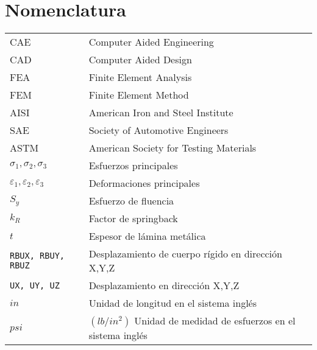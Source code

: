 \chapter*{Nomenclatura}




\begin{table}[h]
\def\arraystretch{1.15}
\begin{tabular}{p{4cm} p{12cm}}

CAE      &                       		      Computer Aided Engineering \\
CAD &                                  		  Computer Aided Design \\
FEA &                                  		  Finite Element Analysis \\
FEM & 							              Finite Element Method \\
AISI &                                        American Iron and Steel Institute \\
SAE &                                         Society of Automotive Engineers \\
ASTM &                                        American Society for Testing Materials \\
$\sigma_1, \sigma_2, \sigma_3$ &              Esfuerzos principales \\
$\varepsilon_1, \varepsilon_2, \varepsilon_3$ & Deformaciones principales \\
$ S_y $ &                                     Esfuerzo de fluencia \\
$ k_R $ &                                     Factor de springback \\
$ t $ &                                       Espesor de lámina metálica \\
{\tt RBUX, RBUY, RBUZ} &                      Desplazamiento de cuerpo rígido en dirección X,Y,Z \\
{\tt UX, UY, UZ} &                            Desplazamiento en dirección X,Y,Z \\
$in$ &                                        Unidad de longitud en el sistema inglés \\
$psi$ &                                       $(lb/in^2)$ Unidad de medidad de esfuerzos en el sistema inglés \\



\end{tabular}
\end{table}